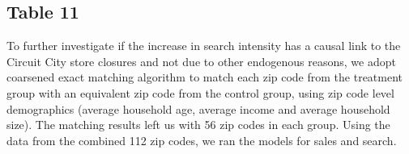 \documentclass{article}
\begin{document}
\subsection{Table 11}
To further investigate if the increase in search intensity has a
causal link to the Circuit City store closures and not due to 
other endogenous reasons, we adopt coarsened exact matching
algorithm to match each zip code from
the treatment group with an equivalent zip code from the
control group, using zip code level demographics (average
household age, average income and average household size).
The matching results left us with 56 zip codes in each group.
Using the data from the combined 112 zip codes, we ran the
models for sales and search.
\begin{table}[!htbp] \centering 
	\caption{Results of the Online Sales and Search Effect After Matching Zip Codes: TotalMonthlySales, PagesPerDollar, and MinsPerDollar (All Product Categories)} 
	\label{tab:table11} 
\end{table}
\end{document}

